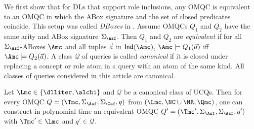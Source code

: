 \documentclass{lmcs}
\theoremstyle{definition}
\begin{document}
We first show that for DLs that support role inclusions, any OMQC is equivalent
to an OMQC in which the ABox signature and the set of closed predicates coincide. 
This setup was called \emph{DBoxes} in \cite{seylan09effective,franconi11query}. 
Assume OMQCs $Q_{1}$ and $Q_{2}$ have the same arity and ABox signature $\Sigma_\Asf$.
Then $Q_{1}$ and $Q_{2}$ are \emph{equivalent} if for all $\Sigma_\Asf$-ABoxes $\Amc$ and all tuples $\vec{a}$ in
${\sf Ind}(\Amc)$, $\Amc\models Q_{1}(\vec{a})$ iff $\Amc\models Q_{2}(\vec{a})$.
A class $\mathcal{Q}$ of queries is called \emph{canonical} if it is
closed under replacing a concept or role atom in a query with an atom
of the same kind.  All classes of queries considered in this article are
canonical. 
\begin{thm}
\label{thm:basic1}
  Let $\Lmc\in \{ \dlliter, \alchi\}$ and
  $\mathcal{Q}$ be a canonical class of UCQs.
  Then for every OMQC $Q=(\Tmc,\Sigma_\Asf,\Sigma_\Csf,q)$ from
  $(\Lmc,\NC \cup \NR,\Qmc)$, one can construct in polynomial time an
  equivalent OMQC $Q'=(\Tmc',\Sigma_\Asf,\Sigma_\Asf,q')$ with
  $\Tmc'\in \Lmc$ and $q'\in \mathcal{Q}$.
\end{thm}
\end{document}
